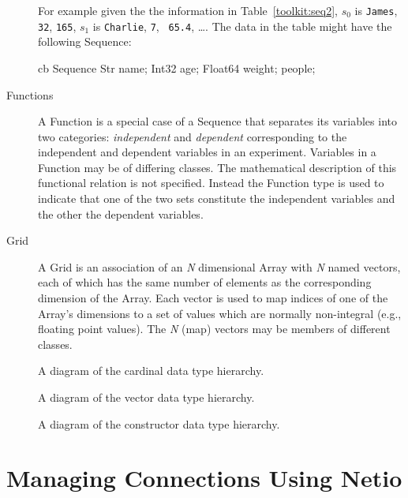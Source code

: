 \begin{description}
For example given the the information in Table~\ref{toolkit:seq2}, $s_{0}$ is
{\tt James}, {\tt 32}, {\tt 165}, $s_{1}$ is {\tt Charlie}, {\tt 7}, {\tt
  65.4}, \ldots. The data in the table might have the following Sequence:

\begin{code}{cb}
Sequence {
    Str name;
    Int32 age;
    Float64 weight;
} people;
\end{code}

\item[Functions] A Function is a special case of a Sequence that separates
  its variables into two categories: {\em independent\/} and {\em
    dependent\/} corresponding to the independent and dependent variables in
  an experiment. Variables in a Function may be of differing classes. The
  mathematical description of this functional relation is not specified.
  Instead the Function type is used to indicate that one of the two sets
  constitute the independent variables and the other the dependent variables.
  
\item[Grid] A Grid is an association of an {\em N\/} dimensional Array with
  {\em N\/} named vectors, each of which has the same number of elements as
  the corresponding dimension of the Array. Each vector is used to map
  indices of one of the Array's dimensions to a set of values which are
  normally non-integral (e.g., floating point values). The {\em N\/} (map)
  vectors may be members of different classes. 

\end{description}

\begin{figure}
\centerline{}
\caption{A diagram of the cardinal data type hierarchy.}
\label{fig:cardinal-types}
\end{figure}

\begin{figure}
\centerline{}
\caption{A diagram of the vector data type hierarchy.}
\label{fig:vector-types}
\end{figure}

\begin{figure}
\centerline{}
\caption{A diagram of the constructor data type hierarchy.}
\label{fig:ctor-types}
\end{figure}

\section{Managing Connections Using Netio} 
\label{tk:manage-conns}

